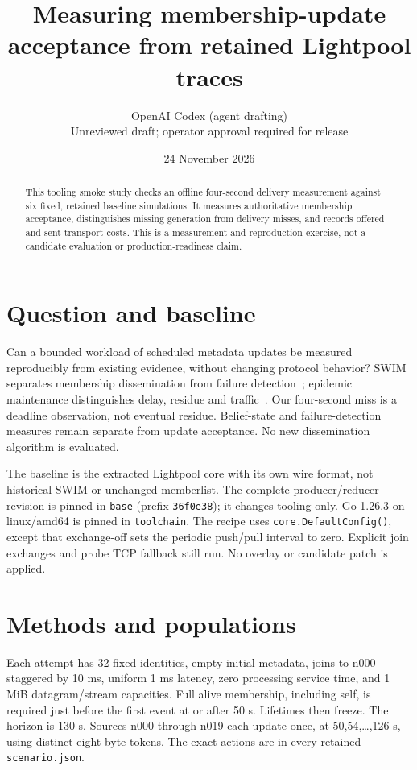 \documentclass[10pt]{article}
\title{Measuring membership-update acceptance from retained Lightpool traces}
\author{OpenAI Codex (agent drafting)\\Unreviewed draft; operator approval required for release}
\date{24 November 2026}
\begin{document}
\maketitle
\begin{abstract}
This tooling smoke study checks an offline four-second delivery measurement
against six fixed, retained baseline simulations. It measures authoritative
membership acceptance, distinguishes missing generation from delivery misses,
and records offered and sent transport costs. This is a measurement and
reproduction exercise, not a candidate evaluation or production-readiness claim.
\end{abstract}

\section{Question and baseline}
Can a bounded workload of scheduled metadata updates be measured reproducibly
from existing evidence, without changing protocol behavior? SWIM separates
membership dissemination from failure detection~\cite{swim}; epidemic
maintenance distinguishes delay, residue and traffic~\cite{demers}.
Our four-second miss is a deadline observation, not eventual residue.
Belief-state and failure-detection measures remain separate from update
acceptance. No new dissemination algorithm is evaluated.

The baseline is the extracted Lightpool core with its own wire format, not
historical SWIM or unchanged memberlist. The complete producer/reducer revision
is pinned in \texttt{base} (prefix \texttt{36f0e38}); it changes tooling only.
Go 1.26.3 on linux/amd64 is pinned in \texttt{toolchain}. The recipe uses
\texttt{core.DefaultConfig()}, except that exchange-off sets the periodic
push/pull interval to zero. Explicit join exchanges and probe TCP fallback still run. No overlay or
candidate patch is applied.

\section{Methods and populations}
Each attempt has 32 fixed identities, empty initial metadata, joins to n000
staggered by 10 ms, uniform 1 ms latency, zero processing service time, and
1 MiB datagram/stream capacities. Full alive membership, including self,
is required just before the first event at or after 50 s. Lifetimes then
freeze. The horizon is 130 s. Sources n000 through n019 each update once,
at 50,54,\ldots,126 s, using distinct eight-byte tokens. The exact actions
are in every retained \texttt{scenario.json}.
\end{document}
